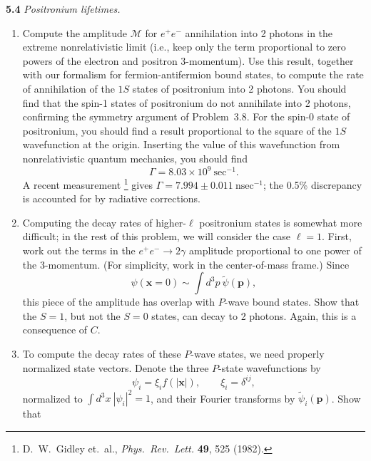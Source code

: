 \textbf{5.4} \emph{Positronium lifetimes.}
\begin{enumerate}[label=(\alph*)]
  \item Compute the amplitude $\mathcal{M}$ for $e^{+}e^{-}$ annihilation into
    2 photons in the extreme nonrelativistic limit (i.e., keep only the term
    proportional to zero powers of the electron and positron 3-momentum).
    Use this result, together with our formalism for fermion-antifermion bound
    states, to compute the rate of annihilation of the $1S$ states of
    positronium into 2 photons.  You should find that the spin-1 states of
    positronium do not annihilate into 2 photons, confirming the symmetry
    argument of Problem~3.8.  For the spin-0 state of positronium, you should
    find a result proportional to the square of the $1S$ wavefunction at the
    origin.  Inserting the value of this wavefunction from nonrelativistic
    quantum mechanics, you should find
    \begin{equation}
      \Gamma = 8.03\times10^9\ \mathrm{sec}^{-1} .
    \end{equation}
    A recent measurement%
    \footnote{D.~W.~Gidley et.\ al., \emph{Phys.\ Rev.\ Lett.} \textbf{49}, 525
    (1982).} gives $\Gamma = 7.994 \pm 0.011\ \mathrm{nsec}^{-1}$; the 0.5\%
    discrepancy is accounted for by radiative corrections.
  \item Computing the decay rates of higher-$\ell$ positronium states is
    somewhat more difficult; in the rest of this problem, we will consider the
    case $\ell = 1$.  First, work out the terms in the $e^{+}e^{-}\to 2\gamma$
    amplitude proportional to one power of the 3-momentum.  (For simplicity,
    work in the center-of-mass frame.)  Since
    \begin{equation}
      \psi(\mathbf{x}=0) \sim \int d^3p\ \tilde{\psi}(\mathbf{p}),
    \end{equation}
    this piece of the amplitude has overlap with $P$-wave bound states.  Show
    that the $S=1$, but not the $S=0$ states, can decay to 2 photons.  Again,
    this is a consequence of $C$.
  \item To compute the decay rates of these $P$-wave states, we need properly
    normalized state vectors.  Denote the three $P$-state wavefunctions by
    \begin{equation}
      \psi_i = \xi_i f(|\mathbf{x}|),\qquad \xi_i = \delta^{ij},
    \end{equation}
    normalized to $\int d^3x\ |\psi_i|^2 = 1$, and their Fourier transforms by
    $\tilde{\psi}_i(\mathbf{p})$.  Show that

\end{enumerate}
